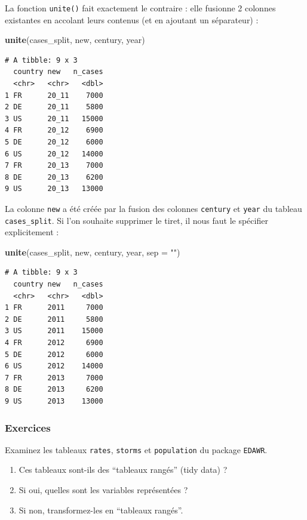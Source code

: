 \documentclass[a4paperpaper,]{article}
\newenvironment{Shaded}{\begin{snugshade}}{\end{snugshade}}
\newcommand{\DataTypeTok}[1]{\textcolor[rgb]{0.00,0.34,0.68}{#1}}
\newcommand{\KeywordTok}[1]{\textcolor[rgb]{0.12,0.11,0.11}{\textbf{#1}}}
\newcommand{\NormalTok}[1]{\textcolor[rgb]{0.12,0.11,0.11}{#1}}
\newcommand{\StringTok}[1]{\textcolor[rgb]{0.75,0.01,0.01}{#1}}
\providecommand{\tightlist}{%
  \setlength{\itemsep}{0pt}\setlength{\parskip}{0pt}}
\begin{document}
La fonction \texttt{unite()} fait exactement le contraire : elle fusionne 2 colonnes existantes en accolant leurs contenus (et en ajoutant un séparateur) :

\begin{Shaded}
\begin{Highlighting}[]
\KeywordTok{unite}\NormalTok{(cases_split, new, century, year)}
\end{Highlighting}
\end{Shaded}

\begin{verbatim}
# A tibble: 9 x 3
  country new   n_cases
  <chr>   <chr>   <dbl>
1 FR      20_11    7000
2 DE      20_11    5800
3 US      20_11   15000
4 FR      20_12    6900
5 DE      20_12    6000
6 US      20_12   14000
7 FR      20_13    7000
8 DE      20_13    6200
9 US      20_13   13000
\end{verbatim}

La colonne \texttt{new} a été créée par la fusion des colonnes \texttt{century} et \texttt{year} du tableau \texttt{cases\_split}. Si l'on souhaite supprimer le tiret, il nous faut le spécifier explicitement :

\begin{Shaded}
\begin{Highlighting}[]
\KeywordTok{unite}\NormalTok{(cases_split, new, century, year, }\DataTypeTok{sep =} \StringTok{""}\NormalTok{)}
\end{Highlighting}
\end{Shaded}

\begin{verbatim}
# A tibble: 9 x 3
  country new   n_cases
  <chr>   <chr>   <dbl>
1 FR      2011     7000
2 DE      2011     5800
3 US      2011    15000
4 FR      2012     6900
5 DE      2012     6000
6 US      2012    14000
7 FR      2013     7000
8 DE      2013     6200
9 US      2013    13000
\end{verbatim}

\hypertarget{exercices-7}{%
\subsubsection{Exercices}\label{exercices-7}}

Examinez les tableaux \texttt{rates}, \texttt{storms} et \texttt{population} du package \texttt{EDAWR}.

\begin{enumerate}
\def\labelenumi{\arabic{enumi}.}
\tightlist
\item
  Ces tableaux sont-ils des ``tableaux rangés'' (tidy data) ?
\item
  Si oui, quelles sont les variables représentées ?
\item
  Si non, transformez-les en ``tableaux rangés''.
\end{enumerate}
\end{document}
